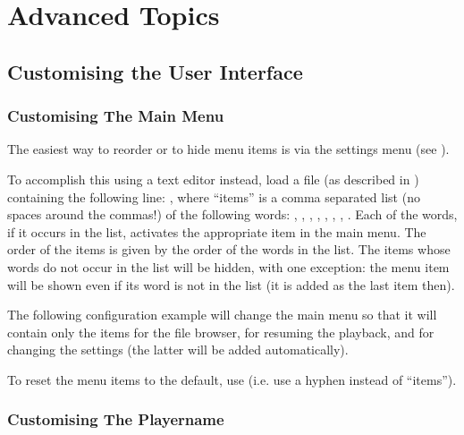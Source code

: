 \chapter{Advanced Topics}

\section{\label{ref:CustomisingUI}Customising the User Interface}

\subsection{\label{ref:CustomisingTheMainMenu}Customising The Main Menu}

The easiest way to reorder or to hide menu items is via the settings menu
(see ).

To accomplish this using a text editor instead, load a  file
(as described in ) containing the following line:
, where ``items'' is a comma separated list
(no spaces around the commas!) of the following
words: , , %
, , %
, ,
, .
Each of the words, if it occurs in the list, activates the appropriate item
in the main menu. The order of the items is given by the order of the words
in the list. The items whose words do not occur in the list will be hidden,
with one exception: the menu item  will be shown even if
its word is not in the list (it is added as the last item then).

The following configuration example will change the main menu so that it will
contain only the items for the file browser, for resuming the playback, and
for changing the settings (the latter will be added automatically).
\begin{example}
\end{example}


To reset the menu items to the default, use  (i.e.
use a hyphen instead of ``items'').

\subsection{\label{ref:CustomisingThePlayername}Customising The Playername}

